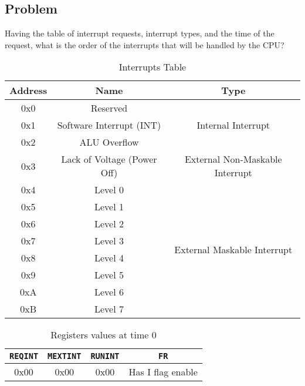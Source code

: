 \subsection*{Problem}
Having the table of interrupt requests, interrupt types, and the time of the request, what is the order of the interrupts that will be handled by the CPU?

\begin{table}[H]
    \centering
        \begin{tabular}{|c|c|c|}
            \hline
            \textbf{Address} & \textbf{Name} & \textbf{Type} \\ \hline
            0x0 & Reserved  & \multirow{3}{*}{Internal Interrupt} \\ \cline{1-2}
            0x1 & Software Interrupt (INT) & \\ \cline{1-2}
            0x2 & ALU Overflow & \\ \hline
            0x3 & Lack of Voltage (Power Off) & External Non-Maskable Interrupt \\ \hline
            0x4 & Level 0 & \multirow{8}{*}{External Maskable Interrupt} \\ \cline{1-2}
            0x5 & Level 1 & \\ \cline{1-2}
            0x6 & Level 2 & \\ \cline{1-2}
            0x7 & Level 3 & \\ \cline{1-2}
            0x8 & Level 4 & \\ \cline{1-2}
            0x9 & Level 5 & \\ \cline{1-2}
            0xA & Level 6 & \\ \cline{1-2}
            0xB & Level 7 & \\ \hline
        \end{tabular}
        \caption{Interrupts Table}
\end{table}

\begin{table}[H]
    \centering
    \begin{tabular}{|c|c|c|c|}
        \hline
        \texttt{REQINT} & \texttt{MEXTINT} & \texttt{RUNINT} & \texttt{FR} \\ \hline
        0x00 & 0x00 & 0x00 & Has I flag enable \\ \hline
    \end{tabular}
    \caption{Registers values at time 0}
\end{table}

